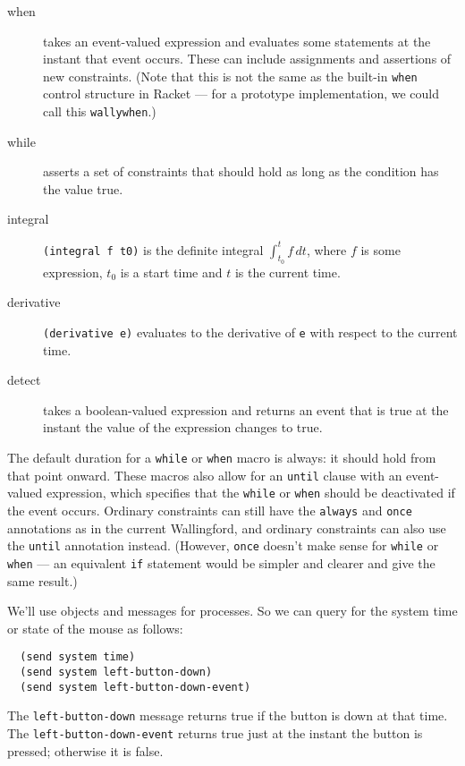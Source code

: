 \documentclass{article}
\begin{document}
\begin{description}
    
\item[when] takes an event-valued expression and evaluates some
  statements at the instant that event occurs.  These can include
  assignments and assertions of new constraints.  (Note that this is not
  the same as the built-in \verb|when| control structure in Racket ---
  for a prototype implementation, we could call this \verb|wallywhen|.)

\item[while] asserts a set of constraints that should hold as long as
  the condition has the value true.

\item[integral] \verb|(integral f t0)| is the definite integral
  $\int_{t_0}^t f \, dt$, where $f$ is some expression, $t_0$ is a start
  time and $t$ is the current time.

\item[derivative] \verb|(derivative e)| evaluates to the derivative of
  \verb|e| with respect to the current time.

\item[detect] takes a boolean-valued expression and returns an event
  that is true at the instant the value of the expression changes to
  true.

\end{description}

The default duration for a \verb|while| or \verb|when| macro is always: it
should hold from that point onward.  These macros also allow for an
\verb|until| clause with an event-valued expression, which specifies that
the \verb|while| or \verb|when| should be deactivated if the event occurs.
Ordinary constraints can still have the {\tt always} and {\tt once}
annotations as in the current Wallingford, and ordinary constraints can
also use the \verb|until| annotation instead.  (However, \verb|once|
doesn't make sense for \verb|while| or \verb|when| --- an equivalent
\verb|if| statement would be simpler and clearer and give the same result.)

We'll use objects and messages for processes.  So we can query for the
system time or state of the mouse as follows:
\begin{verbatim}
  (send system time)
  (send system left-button-down) 
  (send system left-button-down-event)
\end{verbatim}

The \verb|left-button-down| message returns true if the button is down at
that time.  The \verb|left-button-down-event| returns true just at the
instant the button is pressed; otherwise it is false.
\end{document}
